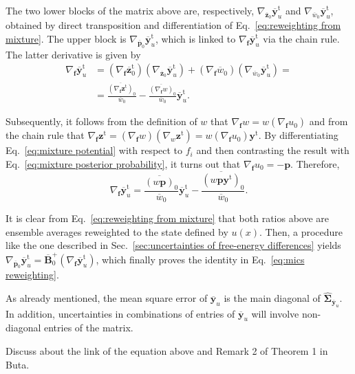 \documentclass[journal=jctcce,manuscript=article,layout=twocolumn]{achemso}
\newcommand{\mt}[1]{\boldsymbol{\mathbf{#1}}}   %
\newcommand{\vt}[1]{\boldsymbol{\mathbf{#1}}}   %
\newcommand{\tr}[1]{#1^\text{t}}                %
\newcommand{\avg}[1]{\overline{#1}}             %
\begin{document}
The two lower blocks of the matrix above are, respectively, $\nabla_{\avg{\vt z}_0} \tr{\avg{\vt y}}_u$ and $\nabla_{\avg{w}_0} \tr{\avg{\vt y}}_u$, obtained by direct transposition and differentiation of Eq.~\eqref{eq:reweighting from mixture}. The upper block is $\nabla_{\avg{\vt p}_0} \tr{\avg{\vt y}}_u$, which is linked to $\nabla_{\vt f} \tr{\avg{\vt y}}_u$ via the chain rule. The latter derivative is given by
\begin{equation*}
\begin{split}
\nabla_{\vt f} \tr{\avg{\vt y}}_u &= (\nabla_{\vt f} \tr{\avg{\vt z}}_0) (\nabla_{\avg{\vt z}_0} \tr{\avg{\vt y}}_u) + (\nabla_{\vt f} {\avg{w}_0}) (\nabla_{\avg{w}_0} \tr{\avg{\vt y}}_u) = \\
&= \frac{{\avg{(\nabla_{\vt f} \tr{\vt z})}_0}}{\avg{w}_0} - \frac{\avg{(\nabla_{\vt f} w)}_0}{\avg{w}_0} \tr{\avg{\vt y}}_u.
\end{split}
\end{equation*}

Subsequently, it follows from the definition of $w$ that $\nabla_{\vt f} w = w (\nabla_{\vt f} u_0)$ and from the chain rule that $\nabla_{\vt f} \tr{\vt z} = (\nabla_{\vt f} w) (\nabla_w \tr{\vt z}) = w (\nabla_{\vt f} u_0) \tr{\vt y}$. By differentiating Eq.~\eqref{eq:mixture potential} with respect to $f_i$ and then contrasting the result with Eq.~\eqref{eq:mixture posterior probability}, it turns out that $\nabla_{\vt f}u_0 = -{\vt p}$. Therefore,
\begin{equation*}
\nabla_{\vt f} \tr{\avg{\vt y}}_u = \frac{\avg{(w {\vt p})}_0}{\avg{w}_0} \tr{\avg{\vt y}}_u - \frac{\avg{(w{\vt p}\tr{\vt y})}_0}{\avg{w}_0}.
\end{equation*}

It is clear from Eq.~\eqref{eq:reweighting from mixture} that both ratios above are ensemble averages reweighted to the state defined by $u(x)$. Then, a procedure like the one described in Sec.~\ref{sec:uncertainties of free-energy differences} yields $\nabla_{\avg{\vt p}_0} \tr{\avg{\vt y}}_u = \avg{\mt B}_0^+ (\nabla_{\vt f} \tr{\avg{\vt y}}_u)$, which finally proves the identity in Eq.~\eqref{eq:mics reweighting}.

As already mentioned, the mean square error of $\avg{\vt y}_u$ is the main diagonal of $\hat{\mt \Sigma}_{\avg{\vt y}_u}$. In addition, uncertainties in combinations of entries of $\avg{\vt y}_u$ will involve non-diagonal entries of the matrix.

Discuss about the link of the equation above and Remark 2 of Theorem 1 in Buta.\cite{Buta_2010}
\end{document}

